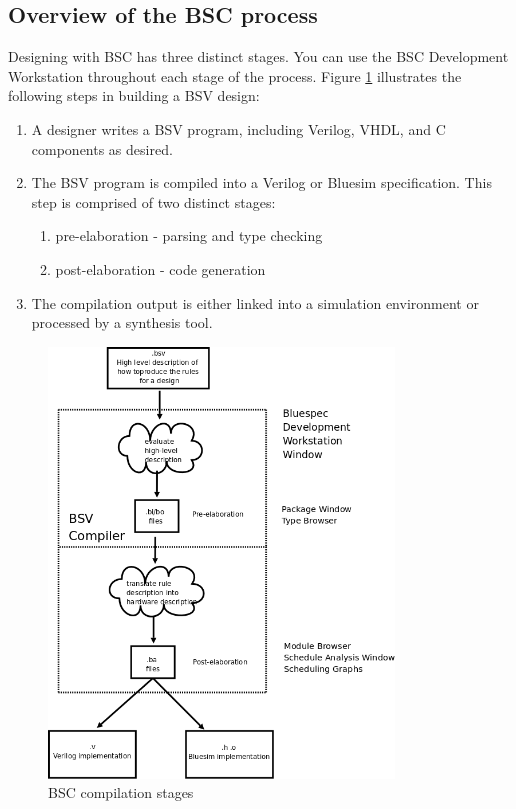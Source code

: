 \documentclass{article}
\begin{document}

\subsection{Overview of the BSC process}

Designing with BSC has three distinct stages.  You can use the
BSC Development Workstation throughout each stage of the process.
Figure \ref{compiler-stages-fig} illustrates the following
steps in building  a BSV design:
\begin{enumerate}
\item A designer writes a BSV program, including Verilog, VHDL,  and C components as desired.
\item The BSV program is  compiled into a Verilog or Bluesim
specification. This step is comprised of two distinct stages:
\begin{enumerate}
\item pre-elaboration - parsing and type checking
\item post-elaboration - code generation
\end{enumerate}
\item  The compilation output is either linked  into a simulation
environment or processed by a synthesis tool.
\end{enumerate}

\begin{figure}[ht]
  \centerline{\includegraphics[angle=0, height=4.5in]{figures/compilerstages}}
  \caption{\label{compiler-stages-fig}BSC compilation stages}
\end{figure}
\end{document}
